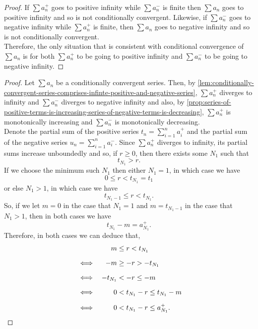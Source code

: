 \documentclass[../MathsNotesBase.tex]{subfiles}
\begin{document}
{\begin{proof}
			If ${ \sum a_n^+ }$ goes to positive infinity while ${ \sum a_n^- }$ is finite then ${ \sum a_n }$ goes to positive infinity and so is not conditionally convergent. Likewise, if ${ \sum a_n^- }$ goes to negative infinity while ${ \sum a_n^+ }$ is finite, then ${ \sum a_n }$ goes to negative infinity and so is not conditionally convergent.\\
			
			Therefore, the only situation that is consistent with conditional convergence of ${ \sum a_n }$ is for both ${ \sum a_n^+ }$ to be going to positive infinity and ${ \sum a_n^- }$ to be going to negative infinity.
		\end{proof}
	
		\medskip
		\begin{proof}
			Let ${ \sum a_n }$ be a conditionally convergent series. Then, by \autoref{lem:conditionally-convergent-series-comprises-infinte-positive-and-negative-series}, ${ \sum a_n^+ }$ diverges to infinity and ${ \sum a_n^- }$ diverges to negative infinity and also, by \autoref{prop:series-of-positive-terms-is-increasing-series-of-negative-terms-is-decreasing}, ${ \sum a_n^+ }$ is monotonically increasing and ${ \sum a_n^- }$ is monotonically decreasing.\\

			Denote the partial sum of the positive series ${ t_n = \sum_{i=1}^n a_i^+ }$ and the partial sum of the negative series ${ u_n = \sum_{i=1}^n a_i^- }$. Since ${ \sum a_n^+ }$ diverges to infinity, its partial sums increase unboundedly and so, if ${ r \geq 0 }$, then there exists some $N_1$ such that
			\[ t_{N_1} > r. \]
			If we choose the minimum such $N_1$ then either ${ N_1 = 1 }$, in which case we have
			\[ 0 \leq r < t_{N_1} = t_1 \]
			or else ${ N_1 > 1 }$, in which case we have
			\[ t_{N_1 - 1} \leq r < t_{N_1}. \]
			So, if we let ${ m = 0 }$ in the case that ${ N_1 = 1 }$ and ${ m = t_{N_1 - 1} }$ in the case that ${ N_1 > 1 }$, then in both cases we have
			\[ t_{N_1} - m = a_{N_1}^+. \]
			Therefore, in both cases we can deduce that,
			\[\begin{aligned}
				&& m &\leq r < t_{N_1} \nn
				&\iff & -m &\geq -r > -t_{N_1} \nn
				&\iff & -t_{N_1} &< -r \leq -m \nn
				&\iff & 0 &< t_{N_1} - r \leq t_{N_1} - m \nn
				&\iff & 0 &< t_{N_1} - r \leq a_{N_1}^+.
			\end{aligned}\]
		

\end{proof}}
\end{document}
